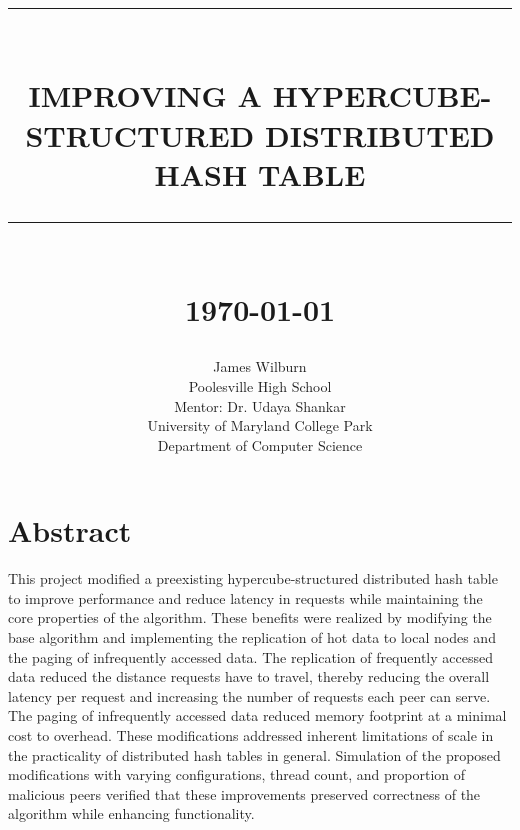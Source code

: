 \documentclass[12pt]{report}
\theoremstyle{plain}
\newcommand{\HRule}[1]{\rule{\linewidth}{#1}}
\begin{document}
\title{
		{
		\begin{center}
			
		\end{center}
		}
		\HRule{0.5pt} \\
		\LARGE \textbf{\uppercase{Improving a Hypercube-Structured Distributed Hash Table}}
		\HRule{2pt} \\ [0.5cm]
		\normalsize \today \vspace*{2\baselineskip}}

\date{}

\author{
		James Wilburn\\ 
		Poolesville High School\\
		Mentor: Dr. Udaya Shankar \\
		University of Maryland College Park\\
		Department of Computer Science }

\begin{titlepage}
\maketitle
\newpage
\end{titlepage}
\sectionfont{\scshape}

\doublespacing
\section*{Abstract}
\hspace{1em}
This project modified a preexisting hypercube-structured distributed hash table to improve performance and reduce latency in requests while maintaining the core properties of the algorithm. These benefits were realized by modifying the base algorithm and implementing the replication of hot data to local nodes and the paging of infrequently accessed data. The replication of frequently accessed data reduced the distance requests have to travel, thereby reducing the overall latency per request and increasing the number of requests each peer can serve. The paging of infrequently accessed data reduced memory footprint at a minimal cost to overhead. These modifications addressed inherent limitations of scale in the practicality of distributed hash tables in general. Simulation of the proposed modifications with varying configurations, thread count, and proportion of malicious peers verified that these improvements preserved correctness of the algorithm while enhancing functionality.
\clearpage
\end{document}
